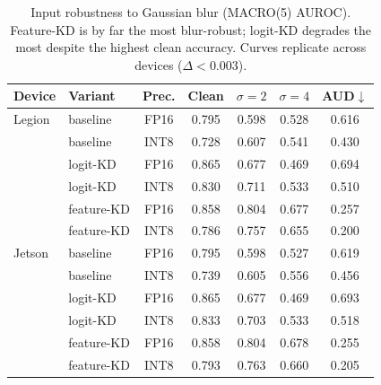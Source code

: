 \begin{table}[t]
\centering
\caption{Input robustness to Gaussian blur (MACRO(5) AUROC). Feature-KD is by far the most blur-robust; logit-KD degrades the most despite the highest clean accuracy. Curves replicate across devices ($\Delta<0.003$).}
\label{tab:robust}
\begin{tabular}{llccccc}
\toprule
Device & Variant & Prec. & Clean & $\sigma{=}2$ & $\sigma{=}4$ & AUD$\downarrow$ \\
\midrule
Legion & baseline & FP16 & 0.795 & 0.598 & 0.528 & 0.616 \\
 & baseline & INT8 & 0.728 & 0.607 & 0.541 & 0.430 \\
 & logit-KD & FP16 & 0.865 & 0.677 & 0.469 & 0.694 \\
 & logit-KD & INT8 & 0.830 & 0.711 & 0.533 & 0.510 \\
 & feature-KD & FP16 & 0.858 & 0.804 & 0.677 & 0.257 \\
 & feature-KD & INT8 & 0.786 & 0.757 & 0.655 & 0.200 \\
\midrule
Jetson & baseline & FP16 & 0.795 & 0.598 & 0.527 & 0.619 \\
 & baseline & INT8 & 0.739 & 0.605 & 0.556 & 0.456 \\
 & logit-KD & FP16 & 0.865 & 0.677 & 0.469 & 0.693 \\
 & logit-KD & INT8 & 0.833 & 0.703 & 0.533 & 0.518 \\
 & feature-KD & FP16 & 0.858 & 0.804 & 0.678 & 0.255 \\
 & feature-KD & INT8 & 0.793 & 0.763 & 0.660 & 0.205 \\
\bottomrule
\end{tabular}
\end{table}
